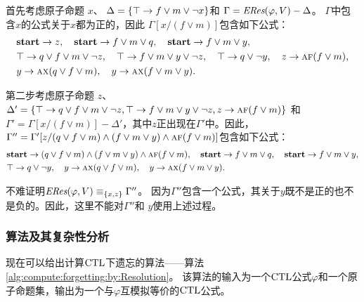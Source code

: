\begin{example}\label{examp:Aclm}
	首先考虑原子命题 $x$、 $\Delta=\{\top \rightarrow f \vee m \vee \neg x\}$和 $\Gamma=\emph{ERes}(\varphi,V)-\Delta$。
	$\Gamma$中包含$x$的公式关于$x$都为正的，因此 $\Gamma[x/(f \vee m)]$包含如下公式：
	\begin{align*}%
		& \start\rto z, \quad \start \rto f\vee m \vee q, \quad  \start \rto f \vee m \vee y, \\
		& \top \rto q \vee f \vee m \vee \neg z, \quad 	\top \rto f \vee m \vee y \vee \neg z,
		\quad \top \rto q\vee\neg y , \quad z \rto \ALL \FUTURE (f \vee m), \\
		& y \rto \ALL\NEXT(q \vee f\vee m), %
		\quad 	y \rto \ALL\NEXT(f\vee m\vee y).
	\end{align*}
	
	第二步考虑原子命题 $z$、
	$\Delta'=\{ \top \rightarrow q \vee f \vee m \vee \neg z, \top \rightarrow f \vee m \vee y \vee \neg z ,z \rightarrow \textsc{a} \textsc{f} (f \vee m)\}$
	和 $\Gamma'=\Gamma[x/(f \vee m)] -\Delta'$，其中$z$正出现在$\Gamma'$中。因此，
	$\Gamma''=\Gamma'[z/ (q \vee f \vee m)\land (f \vee m \vee y)\land\textsc{a} \textsc{f} (f \vee m)]$包含如下公式：
	\begin{align*}%
		& \start\rto  (q \vee f \vee m)\land (f \vee m \vee y)\land\ALL \FUTURE (f \vee m),
		\quad \start \rto f\vee m \vee q, \quad  \start \rto f \vee m \vee y,  \\
		&  \top \rto q\vee\neg y,  \quad y \rto \ALL\NEXT(q \vee f\vee m), \quad y \rto \ALL\NEXT(f\vee m\vee y).
	\end{align*}
	
	不难证明$\emph{ERes}(\varphi,V)\equiv_{\{x,z\}} \Gamma''$。
	因为$\Gamma''$包含一个公式，其关于$y$既不是正的也不是负的。因此，这里不能对$\Gamma''$和 $y$使用上述过程。
\end{example}


\subsubsection{算法及其复杂性分析}
\label{cha4:sec:alg}
现在可以给出计算$\textrm{CTL}$下遗忘的算法——算法\ref{alg:compute:forgetting:by:Resolution}。
该算法的输入为一个$\textrm{CTL}$公式$\varphi$和一个原子命题集，输出为一个与$\varphi$互模拟等价的$\textrm{CTL}$公式。
%


